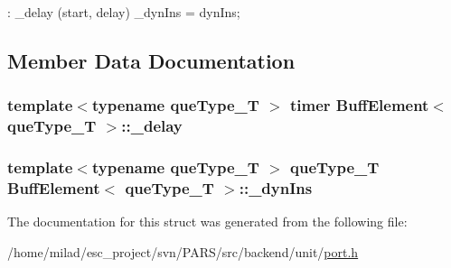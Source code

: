 \begin{DoxyCode}
                : _delay (start, delay) 
        {
                _dynIns = dynIns;
        }
\end{DoxyCode}


\subsection{Member Data Documentation}
\hypertarget{structBuffElement_ada387ae6cbadda86ba737303ee0efb65}{
\subsubsection[{\_\-delay}]{\setlength{\rightskip}{0pt plus 5cm}template$<$typename queType\_\-T $>$ {\bf timer} {\bf BuffElement}$<$ queType\_\-T $>$::{\bf \_\-delay}}}
\label{structBuffElement_ada387ae6cbadda86ba737303ee0efb65}
\hypertarget{structBuffElement_aa61484d95939f5b8f0bdc06321b0fbcf}{
\subsubsection[{\_\-dynIns}]{\setlength{\rightskip}{0pt plus 5cm}template$<$typename queType\_\-T $>$ queType\_\-T {\bf BuffElement}$<$ queType\_\-T $>$::{\bf \_\-dynIns}}}
\label{structBuffElement_aa61484d95939f5b8f0bdc06321b0fbcf}


The documentation for this struct was generated from the following file:\begin{DoxyCompactItemize}
\item 
/home/milad/esc\_\-project/svn/PARS/src/backend/unit/\hyperlink{unit_2port_8h}{port.h}\end{DoxyCompactItemize}

